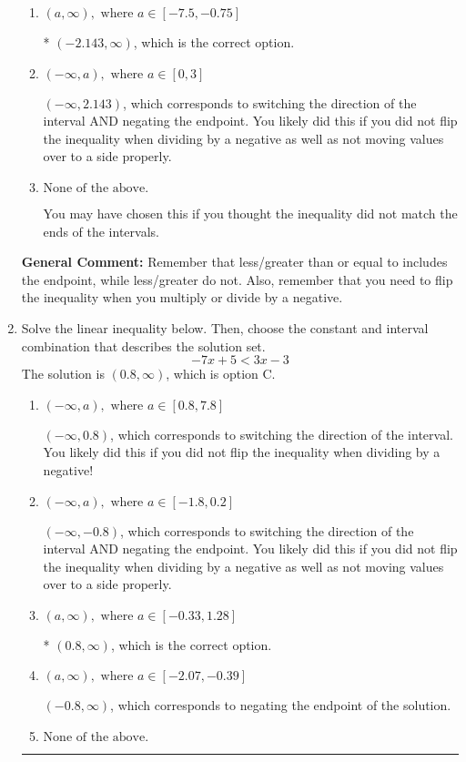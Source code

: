 \documentclass{extbook}[14pt]
\newcommand{\litem}[1]{\item #1

\rule{\textwidth}{0.4pt}}
\begin{document}
\begin{enumerate}
{\begin{enumerate}[label=\Alph*.]
 $(2.143, \infty)$, which corresponds to negating the endpoint of the solution.
\item \( (a, \infty), \text{ where } a \in [-7.5, -0.75] \)

* $(-2.143, \infty)$, which is the correct option.
\item \( (-\infty, a), \text{ where } a \in [0, 3] \)

 $(-\infty, 2.143)$, which corresponds to switching the direction of the interval AND negating the endpoint. You likely did this if you did not flip the inequality when dividing by a negative as well as not moving values over to a side properly.
\item \( \text{None of the above}. \)

You may have chosen this if you thought the inequality did not match the ends of the intervals.
\end{enumerate}

\textbf{General Comment:} Remember that less/greater than or equal to includes the endpoint, while less/greater do not. Also, remember that you need to flip the inequality when you multiply or divide by a negative.
}
\litem{
Solve the linear inequality below. Then, choose the constant and interval combination that describes the solution set.
\[ -7x + 5 < 3x -3 \]The solution is \( (0.8, \infty) \), which is option C.\begin{enumerate}[label=\Alph*.]
\item \( (-\infty, a), \text{ where } a \in [0.8, 7.8] \)

 $(-\infty, 0.8)$, which corresponds to switching the direction of the interval. You likely did this if you did not flip the inequality when dividing by a negative!
\item \( (-\infty, a), \text{ where } a \in [-1.8, 0.2] \)

 $(-\infty, -0.8)$, which corresponds to switching the direction of the interval AND negating the endpoint. You likely did this if you did not flip the inequality when dividing by a negative as well as not moving values over to a side properly.
\item \( (a, \infty), \text{ where } a \in [-0.33, 1.28] \)

* $(0.8, \infty)$, which is the correct option.
\item \( (a, \infty), \text{ where } a \in [-2.07, -0.39] \)

 $(-0.8, \infty)$, which corresponds to negating the endpoint of the solution.
\item \( \text{None of the above}. \)


\end{enumerate}}
\end{enumerate}
\end{document}
